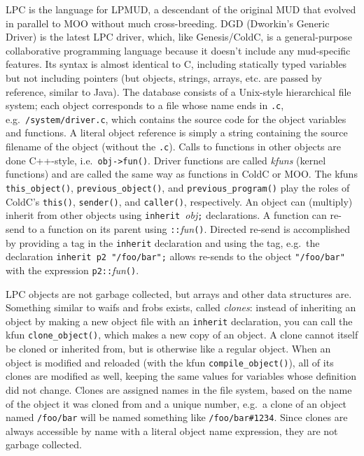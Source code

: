 \documentclass{article}
\begin{document}
LPC is the language for LPMUD, a descendant of the original MUD that
evolved in parallel to MOO without much cross-breeding.  DGD
(Dworkin's Generic Driver) is the latest LPC driver, which, like
Genesis/ColdC, is a general-purpose collaborative programming language
because it doesn't include any mud-specific features.  Its syntax is
almost identical to C, including statically typed variables but not
including pointers (but objects, strings, arrays, etc. are passed by
reference, similar to Java).  The database consists of a Unix-style
hierarchical file system; each object corresponds to a file whose name
ends in \texttt{.c}, e.g.~\texttt{/system/driver.c}, which contains
the source code for the object variables and functions.  A literal
object reference is simply a string containing the source filename of
the object (without the \texttt{.c}).  Calls to functions in other
objects are done C++-style, i.e.~\texttt{obj->fun()}.  Driver
functions are called \emph{kfuns} (kernel functions) and are
called the same way as functions in ColdC or MOO.  The kfuns
\texttt{this\_object()}, \texttt{previous\_object()}, and
\texttt{previous\_program()} play the roles of ColdC's
\texttt{this()}, \texttt{sender()}, and \texttt{caller()},
respectively.  An object can (multiply) inherit from other objects
using \texttt{inherit }\textit{obj}\texttt{;} declarations.  A
function can re-send to a function on its parent using
\texttt{::}\textit{fun}\texttt{()}.  Directed re-send is accomplished
by providing a tag in the \texttt{inherit} declaration and using the
tag, e.g.~the declaration \texttt{inherit p2 "/foo/bar";} allows
re-sends to the object \texttt{"/foo/bar"} with the expression
\texttt{p2::}\textit{fun}\texttt{()}.

LPC objects are not garbage collected, but arrays and other data
structures are.  Something similar to waifs and frobs exists, called
\emph{clones}: instead of inheriting an object by making a new
object file with an \texttt{inherit} declaration, you can call the
kfun \texttt{clone\_object()}, which makes a new copy of an object.  A
clone cannot itself be cloned or inherited from, but is otherwise like 
a regular object.  When an object is modified and reloaded (with the
kfun \texttt{compile\_object()}), all of its clones are modified as
well, keeping the same values for variables whose definition did not
change.  Clones are assigned names in the file system, based on the
name of the object it was cloned from and a unique number, e.g.~a
clone of an object named \texttt{/foo/bar} will be named something
like \texttt{/foo/bar\#1234}.  Since clones are always accessible by
name with a literal object name expression, they are not garbage
collected.
\end{document}
